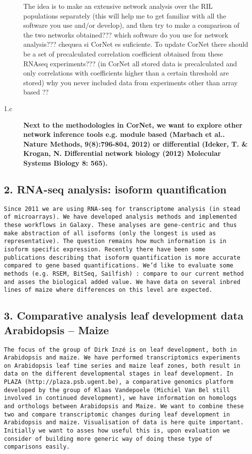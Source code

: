 \documentclass[a4paper,10pt]{article}
\begin{document}
\begin{description}
 The idea is to make an extensive network analysis over the RIL populations separately (this will help me to get familiar with all the software you use and/or develop), and then try to make a comparison of the two networks obtained???
  which software do you use for network analysis??? chequea si CorNet es suficiente.
  To update CorNet there should be a set of precalculated correlation coefficient obtained from these RNAseq experiments??? (in CorNet all stored data is precalculated and only correlations with coefficients higher than a certain threshold are stored)
  why you never included data from experiments other than array based ??
  
  
  \item [1.c]  \textbf{Next to the methodologies in CorNet, we want to explore other network inference tools
e.g. module based (Marbach et al.. Nature Methods, 9(8):796-804, 2012) or differential  (Ideker, T. \& Krogan, N. Differential network biology (2012) Molecular Systems Biology 8: 565).}

  \end{description}


  \subsection{2. RNA-seq analysis: isoform quantification}
\texttt{Since 2011 we are using RNA-seq for transcriptome analysis (in stead of microarrays). We have developed analysis methods and implemented these workflows in Galaxy. These analyses are gene-centric and thus make abstraction of all isoforms (only the longest is used as representative). The question remains how much information is in isoform specific expression. Recently there have been some publications describing that isoform quantification is more accurate compared to gene based quantifications. 
We’d like to evaluate some methods (e.g. RSEM,  BitSeq, Sailfish) : compare to our current method and asses the biological added value. We have data on several inbred lines of maize where differences on this level are expected.}

  \subsection{3. Comparative analysis leaf development data Arabidopsis – Maize}
  \texttt{The focus of the group of Dirk Inzé is on leaf development, both in Arabidopsis and maize. We have performed transcriptomics experiments on Arabidopsis leaf time series and maize leaf zones, both result in data on the different developmental stages in leaf development. 
In PLAZA (http://plaza.psb.ugent.be), a comparative genomics platform developed by the group of Klaas Vandepoele (Michiel Van Bel still involved in continued development), we have information on homologs and orthologs between Arabidopsis and Maize. 
We want to combine these two and compare transcriptomic changes during leaf development in Arabidopsis and maize. Visualisation of data is here quite important. Initially we want to asses how useful this is, upon evaluation we consider of building more generic way of doing these type of comparisons easily.}
  
\end{document}
